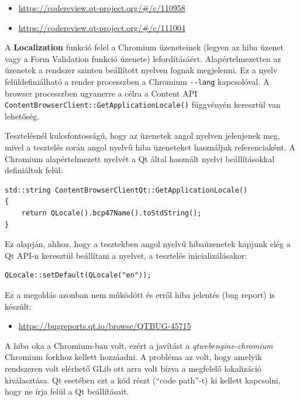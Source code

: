 \documentclass[12pt]{report}
\let\origurl\url
\renewcommand{\url}[1]{%
    \textcolor{blue}{\origurl{#1}}
}
\newcommand{\gerrit}[1]{%
    \textcolor{qtgreen}{\origurl{https://codereview.qt-project.org/\#/c/#1}}
}
\newcommand{\qtbug}[1]{%
    \textcolor{qtred}{\origurl{https://bugreports.qt.io/browse/QTBUG-#1}}
}
\begin{document}
\begin{center}
    \begin{reviewbox}
        \begin{itemize}
            \renewcommand{\labelitemi}{\textcolor{qtgreen}{$\blacktriangleright$}}
            \item \gerrit{110958}
            \item \gerrit{111004}
        \end{itemize}
    \end{reviewbox}
\end{center}

\noindent
A \textbf{Localization} funkció felel a Chromium üzeneteinek (legyen az hiba üzenet vagy
a Form Validation funkció üzenete) lefordításáért. Alapértelmezetten az üzenetek a
rendszer szinten beállított nyelven fognak megjelenni. Ez a nyelv felüldefiniálható
a render processzben a Chromium \texttt{-{}-lang} kapcsolóval. A browser processzben
ugyanerre a célra a Content API \texttt{ContentBrowserClient::GetApplicationLocale()}
függvényén keresztül van lehetőség.

Tesztelésnél kulcsfontosságú, hogy az üzenetek angol nyelven jelenjenek meg, mivel a
tesztelés során angol nyelvű hiba üzeneteket használjuk referenciaként. A Chromium
alapértelmezett nyelvét a Qt által használt nyelvi beállításokkal definiáltuk felül:
\begin{verbatim}
std::string ContentBrowserClientQt::GetApplicationLocale()
{
    return QLocale().bcp47Name().toStdString();
}
\end{verbatim}
Ez alapján, ahhoz, hogy a tesztekben angol nyelvű hibaüzenetek kapjunk elég a Qt API-n
keresztül beállítani a nyelvet, a tesztelés inicializálásakor:
\begin{verbatim}
QLocale::setDefault(QLocale("en"));
\end{verbatim}
Ez a megoldás azonban nem működött és erről hiba jelentés (bug report) is készült:
\begin{center}
    \begin{issuebox}
        \begin{itemize}
            \renewcommand{\labelitemi}{\textcolor{qtred}{$\blacktriangleright$}}
            \item \qtbug{45715}
        \end{itemize}
    \end{issuebox}
\end{center}

A hiba oka a Chromium-ban volt, ezért a javítást a \textit{qtwebengine-chromium} Chromium
forkhoz kellett hozzáadni. A probléma az volt, hogy amelyik rendszeren volt elérhető
GLib ott arra volt bízva a megfelelő lokalizáció kiválasztása. Qt esetében ezt a kód részt
(``code path''-t) ki kellett kapcsolni, hogy ne írja felül a Qt beállításait.
\end{document}
